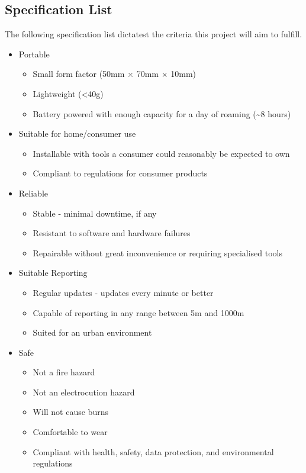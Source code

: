 \documentclass[11pt]{article}
\begin{document}
\subsection{Specification List}
The following specification list dictatest the criteria this project will aim to fulfill.
\begin{itemize}
    \item Portable
    \begin{itemize}
        \item Small form factor (50mm $\times$ 70mm $\times$ 10mm)
        \item Lightweight (<40g)
        \item Battery powered with enough capacity for a day of roaming (\textasciitilde8 hours)
    \end{itemize}
    \item Suitable for home/consumer use
    \begin{itemize}
        \item Installable with tools a consumer could reasonably be expected to own
        \item Compliant to regulations for consumer products
    \end{itemize}
    \item Reliable
    \begin{itemize}
        \item Stable - minimal downtime, if any
        \item Resistant to software and hardware failures
        \item Repairable without great inconvenience or requiring specialised tools
    \end{itemize}
    \item Suitable Reporting
    \begin{itemize}
        \item Regular updates - updates every minute or better
        \item Capable of reporting in any range between 5m and 1000m 
        \item Suited for an urban environment
    \end{itemize}
    \item Safe
    \begin{itemize}
        \item Not a fire hazard
        \item Not an electrocution hazard
        \item Will not cause burns
        \item Comfortable to wear
        \item Compliant with health, safety, data protection, and environmental regulations
    \end{itemize}
\end{itemize}
\end{document}
